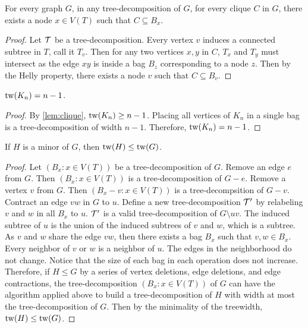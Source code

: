 \begin{lemma}\label{lem:clique}
	For every graph $G$, in any tree-decomposition of \(G\), for every clique \(C\) in \(G\), there exists a node \(x \in V(T)\) such that \(C \subseteq B_x\).
\end{lemma}

\begin{proof}
	Let \(\mathcal{T}\) be a tree-decomposition. Every vertex \(v\) induces a connected subtree in \(T\), call it \(T_v\). Then for any two vertices \(x, y\) in \(C\), \(T_x\) and \(T_y\) must intersect as the edge \(xy\) is inside a bag \(B_z\) corresponding to a node \(z\). Then by the Helly property, there exists a node \(v\) such that \(C \subseteq B_v\).
\end{proof}

\begin{corollary}\label{cor:complete_tw}
	\(\operatorname{tw}(K_n) = n-1\).
\end{corollary}
\begin{proof}
	By \cref{lem:clique}, $\operatorname{tw}(K_n)\geq n-1$. Placing all vertices of $K_n$ in a single bag is a tree-decomposition of width $n-1$. Therefore, $\operatorname{tw}(K_n) = n-1$. 
\end{proof}

\begin{theorem}\label{thm:tw_minor_closure}
	If \(H\) is a minor of \(G\), then \(\operatorname{tw}(H) \leq \operatorname{tw}(G)\).
\end{theorem}
\begin{proof}
	Let \((B_x : x \in V(T))\) be a tree-decomposition of \(G\). Remove an edge $e$ from $G$. Then \((B_x : x \in V(T))\) is a tree-decomposition of $G - e$. Remove a vertex $v$ from $G$. Then \((B_x - v : x \in V(T))\) is a tree-decompsition of $G - v$. Contract an edge $vw$ in $G$ to $u$. Define a new tree-decomposition $\mathcal{T}'$ by relabeling \(v\) and \(w\) in all $B_x$ to \(u\). $\mathcal{T}'$ is a valid tree-decomposition of $G \setminus uv$. The induced subtree of \(u\) is the union of the induced subtrees of \(v\) and \(w\), which is a subtree. As $v$ and $w$ share the edge $vw$, then there exists a bag $B_x$ such that $v, w \in B_x$. Every neighbor of \(v\) or \(w\) is a neighbor of \(u\). The edges in the neighborhood do not change. Notice that the size of each bag in each operation does not increase. Therefore, if $H \leq G$ by a series of vertex deletions, edge deletions, and edge contractions, the tree-decomposition \((B_x : x \in V(T))\) of $G$ can have the algorithm applied above to build a tree-decomposition of $H$ with width at most the tree-decomposition of $G$. Then by the minimality of the treewidth, \(\operatorname{tw}(H) \leq \operatorname{tw}(G)\). 
\end{proof}

